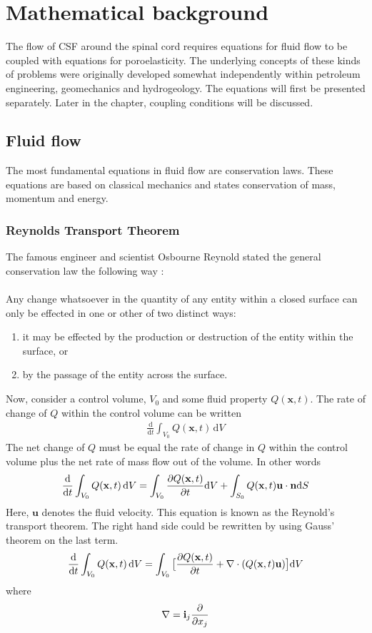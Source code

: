 \chapter{Mathematical background}
The flow of CSF around the spinal cord requires equations for fluid flow to be coupled with equations for poroelasticity. The underlying concepts of these kinds of problems were originally developed somewhat independently within petroleum engineering, geomechanics and hydrogeology. The equations will first be presented separately. Later in the chapter, coupling conditions will be discussed. 
\section{Fluid flow}
The most fundamental equations in fluid flow are conservation laws. These equations are based on classical mechanics and states conservation of mass, momentum and energy. 

\subsection{Reynolds Transport Theorem}
The famous engineer and scientist Osbourne Reynold stated the general conservation law the following way \cite{Reynolds1903}:
\\
\\
Any change whatsoever in the quantity of any entity within a closed surface can only be effected in one or other of two distinct ways:
\begin{enumerate}
\item it may be effected by the production or destruction of the entity within the surface, or
\item by the passage of the entity across the surface.
\end{enumerate}

Now, consider a control volume, $V_0$ and some fluid property $Q(\mathbf{x},t)$. The rate of change of $Q$ within the control volume can be written
\begin{align}
\frac{\mathrm{d}}{\mathrm{d}t} \int_{V_0} Q(\mathbf{x},t) \, \mathrm{d}V \label{Rate_of_change}
\end{align}
The net change of $Q$ must be equal the rate of change in $Q$ within the control volume plus the net rate of mass flow out of the volume. In other words
\begin{align}
\frac{\mathrm{d}}{\mathrm{d}t} \int_{V_0} Q(\mathbf{x},t) \, \mathrm{d}V = \int_{V_0} \frac{\partial Q(\mathbf{x},t)}{\partial t} \mathrm{d}V + \int_{S_0} Q(\mathbf{x},t) \mathbf{u} \cdot \mathbf{n} \mathrm{d}S \label{Reynolds}
\end{align}
Here, $\mathbf{u}$ denotes the fluid velocity. This equation is known as the Reynold's transport theorem. The right hand side could be rewritten by using Gauss' theorem on the last term. 
\begin{align}
\frac{\mathrm{d}}{\mathrm{d}t} \int_{V_0} Q(\mathbf{x},t) \, \mathrm{d}V = \int_{V_0} \big{[}\frac{\partial Q(\mathbf{x},t)}{\partial t} + \nabla \cdot (Q(\mathbf{x},t) \mathbf{u}) \big{]}\mathrm{d}V
\end{align}
where \[ \nabla = \mathbf{i}_j\frac{\partial }{\partial x_j} \]

